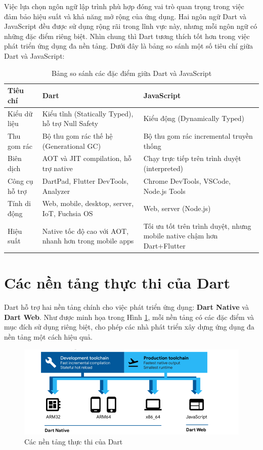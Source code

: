 \documentclass[../DoAn.tex]{subfiles}
\numberwithin{figure}{chapter}
\begin{document}
Việc lựa chọn ngôn ngữ lập trình phù hợp đóng vai trò quan trọng trong việc đảm bảo hiệu suất và khả năng mở rộng của ứng dụng. Hai ngôn ngữ Dart và JavaScript đều được sử dụng rộng rãi trong lĩnh vực này, nhưng mỗi ngôn ngữ có những đặc điểm riêng biệt. Nhìn chung thì Dart tương thích tốt hơn trong việc phát triển ứng dụng đa nền tảng. Dưới đây là bảng so sánh một số tiêu chí giữa Dart và JavaScript:
\begin{table}[H]
\centering
\begin{tabular}{|>{\centering\arraybackslash}p{4.5cm}|>{\centering\arraybackslash}p{4.5cm}|>{\centering\arraybackslash}p{4.5cm}|}
\hline
\textbf{Tiêu chí} & \textbf{Dart} & \textbf{JavaScript} \\ \hline
Kiểu dữ liệu & Kiểu tĩnh (Statically Typed), hỗ trợ Null Safety & Kiểu động (Dynamically Typed) \\ \hline
Thu gom rác & Bộ thu gom rác thế hệ (Generational GC) & Bộ thu gom rác incremental truyền thống \\ \hline
Biên dịch & AOT và JIT compilation, hỗ trợ native & Chạy trực tiếp trên trình duyệt (interpreted) \\ \hline
Công cụ hỗ trợ & DartPad, Flutter DevTools, Analyzer & Chrome DevTools, VSCode, Node.js Tools \\ \hline
Tính di động & Web, mobile, desktop, server, IoT, Fuchsia OS & Web, server (Node.js) \\ \hline
Hiệu suất & Native tốc độ cao với AOT, nhanh hơn trong mobile apps & Tối ưu tốt trên trình duyệt, nhưng mobile native chậm hơn Dart+Flutter \\ \hline
\end{tabular}
\caption{Bảng so sánh các đặc điểm giữa Dart và JavaScript}
\label{tab:dart_vs_js}
\end{table}

\section{Các nền tảng thực thi của Dart}

Dart hỗ trợ hai nền tảng chính cho việc phát triển ứng dụng: \textbf{Dart Native} và \textbf{Dart Web}. Như được minh họa trong Hình \ref{fig:dart_platforms}, mỗi nền tảng có các đặc điểm và mục đích sử dụng riêng biệt, cho phép các nhà phát triển xây dựng ứng dụng đa nền tảng một cách hiệu quả.

\begin{figure}[H]
    \centering
    \includegraphics[width=1\textwidth]{Hinhve/dartPlatform.png}
    \caption{Các nền tảng thực thi của Dart}
    \label{fig:dart_platforms}
\end{figure}
\end{document}
